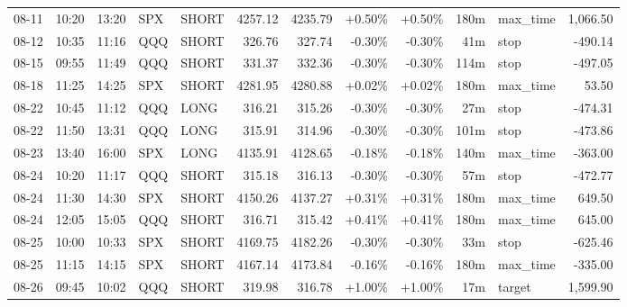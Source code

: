 \documentclass[11pt,a4paper,twoside]{article}
\begin{document}
\begin{center}
\begin{longtable}{>{\color{txtmain}}l l l l l r r r r r >{\color{txtmain}}l r}
08-11 & 10:20 & 13:20 & SPX & SHORT & 4257.12 & 4235.79 & \textcolor{wingreen}{+0.50\%} & \textcolor{wingreen}{+0.50\%} & 180m & max\_time & \textcolor{wingreen}{1,066.50} \\
08-12 & 10:35 & 11:16 & QQQ & SHORT & 326.76 & 327.74 & \textcolor{lossred}{-0.30\%} & \textcolor{lossred}{-0.30\%} & 41m & stop & \textcolor{lossred}{-490.14} \\
08-15 & 09:55 & 11:49 & QQQ & SHORT & 331.37 & 332.36 & \textcolor{lossred}{-0.30\%} & \textcolor{lossred}{-0.30\%} & 114m & stop & \textcolor{lossred}{-497.05} \\
08-18 & 11:25 & 14:25 & SPX & SHORT & 4281.95 & 4280.88 & \textcolor{wingreen}{+0.02\%} & \textcolor{wingreen}{+0.02\%} & 180m & max\_time & \textcolor{wingreen}{53.50} \\
08-22 & 10:45 & 11:12 & QQQ & LONG & 316.21 & 315.26 & \textcolor{lossred}{-0.30\%} & \textcolor{lossred}{-0.30\%} & 27m & stop & \textcolor{lossred}{-474.31} \\
08-22 & 11:50 & 13:31 & QQQ & LONG & 315.91 & 314.96 & \textcolor{lossred}{-0.30\%} & \textcolor{lossred}{-0.30\%} & 101m & stop & \textcolor{lossred}{-473.86} \\
08-23 & 13:40 & 16:00 & SPX & LONG & 4135.91 & 4128.65 & \textcolor{lossred}{-0.18\%} & \textcolor{lossred}{-0.18\%} & 140m & max\_time & \textcolor{lossred}{-363.00} \\
08-24 & 10:20 & 11:17 & QQQ & SHORT & 315.18 & 316.13 & \textcolor{lossred}{-0.30\%} & \textcolor{lossred}{-0.30\%} & 57m & stop & \textcolor{lossred}{-472.77} \\
08-24 & 11:30 & 14:30 & SPX & SHORT & 4150.26 & 4137.27 & \textcolor{wingreen}{+0.31\%} & \textcolor{wingreen}{+0.31\%} & 180m & max\_time & \textcolor{wingreen}{649.50} \\
08-24 & 12:05 & 15:05 & QQQ & SHORT & 316.71 & 315.42 & \textcolor{wingreen}{+0.41\%} & \textcolor{wingreen}{+0.41\%} & 180m & max\_time & \textcolor{wingreen}{645.00} \\
08-25 & 10:00 & 10:33 & SPX & SHORT & 4169.75 & 4182.26 & \textcolor{lossred}{-0.30\%} & \textcolor{lossred}{-0.30\%} & 33m & stop & \textcolor{lossred}{-625.46} \\
08-25 & 11:15 & 14:15 & SPX & SHORT & 4167.14 & 4173.84 & \textcolor{lossred}{-0.16\%} & \textcolor{lossred}{-0.16\%} & 180m & max\_time & \textcolor{lossred}{-335.00} \\
08-26 & 09:45 & 10:02 & QQQ & SHORT & 319.98 & 316.78 & \textcolor{wingreen}{+1.00\%} & \textcolor{wingreen}{+1.00\%} & 17m & target & \textcolor{wingreen}{1,599.90} \\

\end{longtable}
\end{center}
\end{document}
